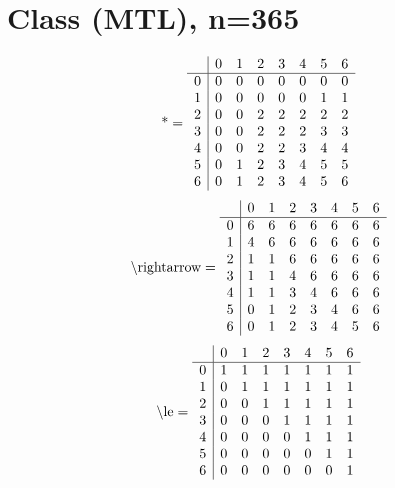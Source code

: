 \documentclass[11pt]{article}
\begin{document}
\section{Class (MTL), n=365}
\[\text{*} = 
\begin{array}{r | r r r r r r r}
 & 0 & 1 & 2 & 3 & 4 & 5 & 6 \\ \hline
0 & 0 & 0 & 0 & 0 & 0 & 0 & 0 \\
1 & 0 & 0 & 0 & 0 & 0 & 1 & 1 \\
2 & 0 & 0 & 2 & 2 & 2 & 2 & 2 \\
3 & 0 & 0 & 2 & 2 & 2 & 3 & 3 \\
4 & 0 & 0 & 2 & 2 & 3 & 4 & 4 \\
5 & 0 & 1 & 2 & 3 & 4 & 5 & 5 \\
6 & 0 & 1 & 2 & 3 & 4 & 5 & 6 \\
\end{array}
\]
\[\text{\textbackslash rightarrow} = 
\begin{array}{r | r r r r r r r}
 & 0 & 1 & 2 & 3 & 4 & 5 & 6 \\ \hline
0 & 6 & 6 & 6 & 6 & 6 & 6 & 6 \\
1 & 4 & 6 & 6 & 6 & 6 & 6 & 6 \\
2 & 1 & 1 & 6 & 6 & 6 & 6 & 6 \\
3 & 1 & 1 & 4 & 6 & 6 & 6 & 6 \\
4 & 1 & 1 & 3 & 4 & 6 & 6 & 6 \\
5 & 0 & 1 & 2 & 3 & 4 & 6 & 6 \\
6 & 0 & 1 & 2 & 3 & 4 & 5 & 6 \\
\end{array}
\]
\[\text{\textbackslash le} = 
\begin{array}{r | r r r r r r r}
 & 0 & 1 & 2 & 3 & 4 & 5 & 6 \\ \hline
0 & 1 & 1 & 1 & 1 & 1 & 1 & 1 \\
1 & 0 & 1 & 1 & 1 & 1 & 1 & 1 \\
2 & 0 & 0 & 1 & 1 & 1 & 1 & 1 \\
3 & 0 & 0 & 0 & 1 & 1 & 1 & 1 \\
4 & 0 & 0 & 0 & 0 & 1 & 1 & 1 \\
5 & 0 & 0 & 0 & 0 & 0 & 1 & 1 \\
6 & 0 & 0 & 0 & 0 & 0 & 0 & 1 \\
\end{array}
\]
\end{document}
